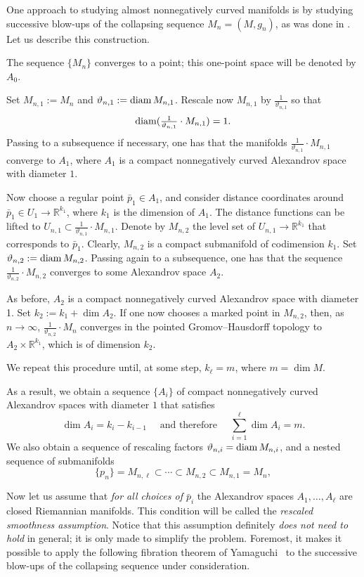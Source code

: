 \documentclass{amsart}
\begin{document}
One approach to studying almost nonnegatively curved manifolds is by studying successive blow-ups of the collapsing sequence $M_n=(M,g_n)$, as was done in \cite[Section 4.3]{KPT}.
Let us describe this construction.

The sequence $\{M_n\}$ converges to a point; this one-point space will be denoted by $A_0$.

Set $M_{n,1}:=M_n$ and $\vartheta_{n,1}:=\operatorname{\rm diam} M_{n,1}$.
Rescale now $M_{n,1}$ by $\tfrac{1}{\vartheta_{n,1}}$
so that 
\[\operatorname{\rm diam}(\tfrac{1}{\vartheta_{n,1}}\cdot M_{n,1})=1.\]
Passing to a subsequence if necessary, one has
that the manifolds $\frac{1}{\vartheta_{n,1}}{\cdot} M_{n,1}$
converge to $A_1$,
where $A_1$
is a compact nonnegatively curved Alexandrov space with diameter $1$.

Now choose a regular point $\bar p_1\in A_1$,
and consider distance coordinates around $\bar p_1\in U_1\to \mathbb{R}^{k_1}$,
where $k_1$ is the dimension of $A_1$.
The distance functions can be lifted
to $U_{n,1}\subset \frac{1}{\vartheta_{n,1}}{\cdot} M_{n,1}$.
Denote by $M_{n,2}$ the level set of $U_{n,1}\to \mathbb{R}^{k_1}$ that corresponds to $\bar p_1$.
Clearly, $M_{n,2}$ is a compact submanifold of codimension $k_1$.
Set $\vartheta_{n,2}:=\operatorname{\rm diam} M_{n,2}$.
Passing again to a subsequence, one has
that the sequence $\frac{1}{\vartheta_{n,2}}{\cdot} M_{n,2}$
converges to some  Alexandrov space $A_2$.

As before, $A_2$ is a compact nonnegatively curved Alexandrov space with diameter 1.
Set $k_2:=k_1+\dim A_2$.
If one now chooses a marked point in $M_{n,2}$,
then, as $n\to\infty$,
$\frac{1}{\vartheta_{n,2}}{\cdot} M_{n}$ converges 
in the pointed Gromov--Hausdorff topology
to $A_2\times\mathbb{R}^{k_1}$,
which is of dimension $k_2$.

We repeat this procedure until, at some step, $k_\ell=m$, where $m=\dim M$.

\medskip

As a result, we obtain a sequence $\{A_i\}$ of compact nonnegatively curved Alexandrov spaces
with diameter $1$ that satisfies
$$\dim A_i=k_i-k_{i-1} 
\quad\text{ and therefore }\quad
\sum_{i=1}^\ell\dim A_i=m.$$
We also obtain
a sequence of rescaling factors $\vartheta_{n,i}=\operatorname{\rm diam} M_{n,i}$,
and  a nested sequence of submanifolds
$$\{p_n\}=M_{n,\ell}\subset \cdots \subset M_{n,2}\subset M_{n,1}=M_n,$$

Now let us assume that \emph{for all choices of $\bar p_i$}
the Alexandrov spaces $A_1,\dots, A_\ell$ are closed  Riemannian manifolds.
This condition will be called the \emph{rescaled smoothness assumption}.
Notice that this assumption definitely \emph{does not need to hold} in general;
it is only made to simplify the problem.
Foremost, it makes it possible to apply the following fibration theorem of Yamaguchi~\cite{Yam} to the successive blow-ups of the collapsing sequence under consideration.
\end{document}

